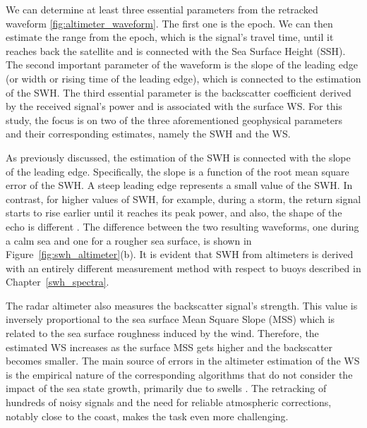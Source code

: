 We can determine at least three essential parameters from the retracked waveform \ref{fig:altimeter_waveform}. The first one is the epoch. We can then estimate the range from the epoch, which is the signal's travel time, until it reaches back the satellite and is connected with the Sea Surface Height (SSH). The second important parameter of the waveform is the slope of the leading edge (or width or rising time of the leading edge), which is connected to the estimation of the SWH. The third essential parameter is the backscatter coefficient derived by the received signal's power and is associated with the surface WS. For this study, the focus is on two of the three aforementioned geophysical parameters and their corresponding estimates, namely the SWH and the WS.

As previously discussed, the estimation of the SWH is connected with the slope of the leading edge. Specifically, the slope is a function of the root mean square error of the SWH. A steep leading edge represents a small value of the SWH. In contrast, for higher values of SWH, for example, during a storm, the return signal starts to rise earlier until it reaches its peak power, and also, the shape of the echo is different \cite{Ardhuin2019}. The difference between the two resulting waveforms, one during a calm sea and one for a rougher sea surface, is shown in Figure~\ref{fig:swh_altimeter}(b). It is evident that SWH from altimeters is derived with an entirely different measurement method with respect to buoys described in Chapter~\ref{swh_spectra}.


The radar altimeter also measures the backscatter signal's strength. This value is inversely proportional to the sea surface Mean Square Slope (MSS) \cite{Cox1954} which is related to the sea surface roughness induced by the wind. Therefore, the estimated WS increases as the surface MSS gets higher and the backscatter becomes smaller. The main source of errors in the altimeter estimation of the WS is the empirical nature of the corresponding algorithms that do not consider the impact of the sea state growth, primarily due to swells \cite{Abdalla2007, Glazman1990}. The retracking of hundreds of noisy signals and the need for reliable atmospheric corrections, notably close to the coast, makes the task even more challenging.



